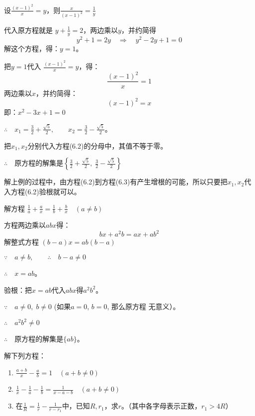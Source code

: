 \begin{solution}
设$\frac{(x-1)^2}{x}=y$，则$\frac{x}{(x-1)^2}=\frac{1}{y}$

代入原方程就是 $y+\frac{1}{y}=2$，两边乘以$y$，并约简得
\[y^2+1=2y\quad \Rightarrow\quad y^2-2y+1=0\]
解这个方程，得：$y=1$。

把$y=1$代入 $\frac{(x-1)^2}{x}=y$，得：
\begin{equation}
    \frac{(x-1)^2}{x}=1
\end{equation}
两边乘以$x$，并约简得：
\begin{equation}
    (x-1)^2=x
\end{equation}
即：$x^2-3x+1=0$

$\therefore\quad x_1=\frac{3}{2}+\frac{\sqrt{5}}{2},\qquad x_2=\frac{3}{2}-\frac{\sqrt{5}}{2}$。

把$x_1,x_2$分别代入方程(6.2)的分母中，其值不等于零。

$\therefore\quad $原方程的解集是$\left\{\frac{3}{2}+\frac{\sqrt{5}}{2},\; \frac{3}{2}-\frac{\sqrt{5}}{2}\right\}$

\end{solution}

\begin{note}
   解上例的过程中，由方程(6.2)到方程(6.3)有产生增根的可能，所以只要把$x_1,x_2$代入方程(6.2)验根就可以。
\end{note}



\begin{example}
    解方程
$\frac{1}{a}+\frac{a}{x}=\frac{1}{b}+\frac{b}{x}\quad (a\ne b)$
\end{example}

\begin{solution}
    方程两边乘以$abx$得：
\[bx+a^2b=ax+ab^2\]
解整式方程 $(b-a)x=ab(b-a)$

$\because\quad a\ne b,\qquad \therefore\quad b-a\ne 0$

$\therefore\quad x=ab$。

验根：把$x=ab$代入$abx$得$a^2b^2$。

$\because\quad a\ne 0,\; b\ne 0$ (如果$a=0$, $b=0$, 那么原方程
无意义）。

$\therefore\quad a^2b^2\ne 0$

$\therefore\quad $原方程的解集是$\{ab\}$。
\end{solution}

\begin{ex}
    解下列方程：
\begin{enumerate}
    \item $\frac{a+b}{x}-\frac{a}{b}=1\quad (a+b\ne 0)$
    \item $\frac{1}{x}-\frac{1}{a}-\frac{1}{b}=\frac{1}{x-a-b}\quad (a+b\ne 0)$
    \item 在$\frac{1}{R}=\frac{1}{r}-\frac{1}{r-r_1}$中，已知$R,r_1$，求$r$。（其中各字母表示正数，$r_1>4R$）
\end{enumerate}
\end{ex}

